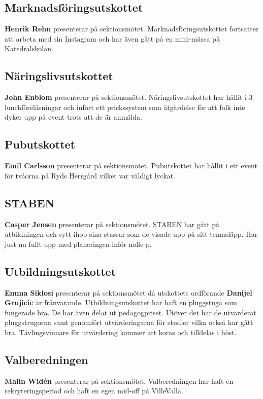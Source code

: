 \documentclass[../protokoll_varmote_2022.tex]{subfiles}
\begin{document}
\subsection{Marknadsföringsutskottet}
\textbf{Henrik Rehn} presenterar på sektionsmötet.
Marknadsföringsutskottet fortsätter att arbeta med sin Instagram och har även gått på en mini-mässa på Katedralskolan.

\subsection{Näringslivsutskottet}
\textbf{John Enblom} presenterar på sektionsmötet.
Näringslivsutskottet har hållit i 3 lunchföreläsningar och infört ett prickssystem som åtgärdelse för att folk inte dyker upp på event trots att de är anmälda.

\subsection{Pubutskottet}
\textbf{Emil Carlsson} presenterar på sektionsmötet.
Pubutskottet har hållit i ett event för tvåorna på Ryds Herrgård vilket var väldigt lyckat.

\subsection{STABEN}
\textbf{Casper Jensen} presenterar på sektionsmötet.
STABEN har gått på utbildningen och sytt ihop sina stassar som de visade upp på sitt temasläpp. Har just nu fullt upp med planeringen inför nolle-p.

\subsection{Utbildningsutskottet}
\textbf{Emma Siklosi} presenterar på sektionsmötet då utskottets ordförande \textbf{Danijel Grujicic} är frånvarande.
Utbildningsutskottet har haft en pluggstuga som fungerade bra. De har även delat ut pedagogpriset. Utöver det har de utvärderat pluggstrugorna samt genomfört utvärderingarna för studier vilka också har gått bra. Tävlingsvinnare för utvärdering kommer att koras och tilldelas i höst.

\subsection{Valberedningen}
\textbf{Malin Widén} presenterar på sektionsmötet.
Valberedningen har haft en rekryteringsperiod och haft en egen mid-off på VilleValla.
\end{document}
